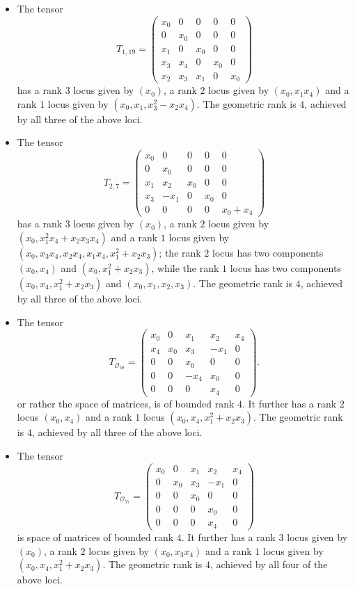 \documentclass[a4paper,10pt]{article}
\def\O{\mathcal O}
\def\mtrx#1{\begin{pmatrix}#1\end{pmatrix}}
\theoremstyle{definition}
\theoremstyle{remark}
\begin{document}
\begin{itemize}
    \item The tensor
    \[
        T_{1,19} = \mtrx{
            x_0 & 0 & 0 & 0 & 0 \\
            0 & x_0 & 0 & 0 & 0 \\
            x_1 & 0 & x_0 & 0 & 0 \\
            x_3 & x_4 & 0 & x_0 & 0 \\
            x_2 & x_3 & x_1 & 0 & x_0
        }
    \]
    has a rank $3$ locus given by $(x_0)$, a rank $2$ locus given by $(x_0, x_1x_4)$ and a rank $1$ locus given by $(x_0,x_1,x_3^2-x_2x_4)$. The geometric rank is $4$, achieved by all three of the above loci.

    \item The tensor
    \[
        T_{2,7} = \mtrx{
            x_0 & 0 & 0 & 0 & 0 \\
            0 & x_0 & 0 & 0 & 0 \\
            x_1 & x_2 & x_0 & 0 & 0 \\
            x_3 & -x_1 & 0 & x_0 & 0 \\
            0 & 0 & 0 & 0 & x_0 + x_4
        }
    \]
    has a rank $3$ locus given by $(x_0)$, a rank $2$ locus given by $(x_0, x_1^2x_4+x_2x_3x_4)$ and a rank $1$ locus given by $(x_0, x_3x_4,x_2x_4, x_1x_4, x_1^2+x_2x_3)$; the rank $2$ locus has two components $(x_0,x_4)$ and $(x_0,x_1^2+x_2x_3)$, while the rank $1$ locus has two components $(x_0,x_4,x_1^2+x_2x_3)$ and $(x_0,x_1,x_2,x_3)$. The geometric rank is $4$, achieved by all three of the above loci.

    \item The tensor
    \[
        T_{\O_{58}} = \mtrx{
            x_0 & 0 & x_1 & x_2 & x_4 \\
            x_4 & x_0 & x_3 & -x_1 & 0 \\
            0 & 0 & x_0 & 0 & 0 \\
            0 & 0 & - x_4 & x_0 & 0 \\
            0 & 0 & 0 & x_4 & 0
        }.
    \]
    or rather the space of matrices, is of bounded rank $4$. It further has a rank $2$ locus $(x_0,x_4)$ and a rank $1$ locus $(x_0,x_4,x_1^2+x_2x_3)$. The geometric rank is $4$, achieved by all three of the above loci.

    \item The tensor
    \[
        T_{\O_{57}} = \mtrx{
            x_0 & 0 & x_1 & x_2 & x_4 \\
            0 & x_0 & x_3 & -x_1 & 0 \\
            0 & 0 & x_0 & 0 & 0 \\
            0 & 0 & 0 & x_0 & 0 \\
            0 & 0 & 0 & x_4 & 0
        }
    \]
    is space of matrices of bounded rank $4$. It further has a rank $3$ locus given by $(x_0)$, a rank $2$ locus given by $(x_0,x_3x_4)$ and a rank $1$ locus given by $(x_0,x_4,x_1^2+x_2x_3)$. The geometric rank is $4$, achieved by all four of the above loci.


\end{itemize}
\end{document}
